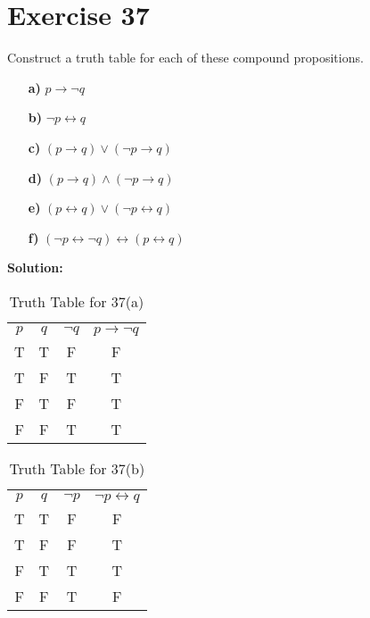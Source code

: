 \documentclass{Axon}
\begin{document}
\section*{Exercise 37}
Construct a truth table for each of these compound propositions.
\begin{enumerate}
    \item[\textbf{a)}] \(p \to \lnot q\)
    \item[\textbf{b)}] \(\lnot p \leftrightarrow q\)
    \item[\textbf{c)}] \((p \to q) \lor (\lnot p \to q)\)
    \item[\textbf{d)}] \((p \to q) \land (\lnot p \to q)\)
    \item[\textbf{e)}] \((p \leftrightarrow q) \lor (\lnot p \leftrightarrow q)\)
    \item[\textbf{f)}] \((\lnot p \leftrightarrow \lnot q) \leftrightarrow (p \leftrightarrow q)\)
\end{enumerate}

\noindent
\textbf{Solution:}
\begin{table}[ht]
    \centering
    \begin{tabular}{c|c|c|c}
        \(p\) & \(q\) & \(\lnot q\) & \(p \to \lnot q\) \\
        T     & T     & F           & F                 \\
        T     & F     & T           & T                 \\
        F     & T     & F           & T                 \\
        F     & F     & T           & T
    \end{tabular}
    \caption{Truth Table for 37(a)}
\end{table}

\begin{table}[ht]
    \centering
    \begin{tabular}{c|c|c|c}
        \(p\) & \(q\) & \(\lnot p\) & \(\lnot p \leftrightarrow q\) \\
        T     & T     & F           & F                             \\
        T     & F     & F           & T                             \\
        F     & T     & T           & T                             \\
        F     & F     & T           & F
    \end{tabular}
    \caption{Truth Table for 37(b)}
\end{table}
\end{document}
